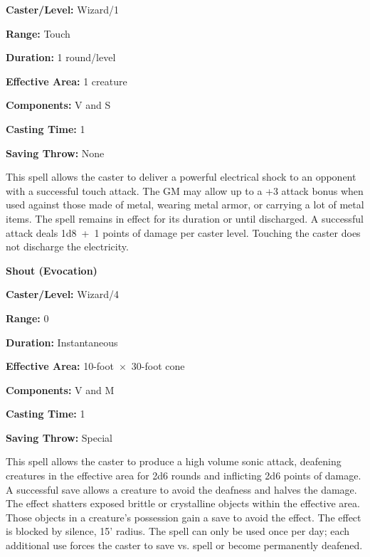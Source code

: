 \begin{multicols}{2}
\begin{minipage}{\columnwidth}
\noindent \textbf{Caster/Level:} Wizard/1

\noindent \textbf{Range:} Touch

\noindent \textbf{Duration:} 1 round/level

\noindent \textbf{Effective Area:} 1 creature

\noindent \textbf{Components:} V and S

\noindent \textbf{Casting Time:} 1

\noindent \textbf{Saving Throw:} None

\end{minipage}

This spell allows the caster to deliver a powerful electrical shock to an opponent with a successful touch attack.  The GM may allow up to a +3 attack bonus when used against those made of metal, wearing metal armor, or carrying a lot of metal items.  The spell remains in effect for its duration or until discharged.  A successful attack deals 1d8~+~1 points of damage per caster level.  Touching the caster does not discharge the electricity.

\vspace{1em}

\noindent
\begin{minipage}{\columnwidth}

\noindent \textbf{Shout (Evocation)}

\noindent \textbf{Caster/Level:} Wizard/4

\noindent \textbf{Range:} 0

\noindent \textbf{Duration:} Instantaneous

\noindent \textbf{Effective Area:} 10-foot~$\times$~30-foot cone

\noindent \textbf{Components:} V and M

\noindent \textbf{Casting Time:} 1

\noindent \textbf{Saving Throw:} Special

\end{minipage}

This spell allows the caster to produce a high volume sonic attack, deafening creatures in the effective area for 2d6 rounds and inflicting 2d6 points of damage.  A successful save allows a creature to avoid the deafness and halves the damage.  The effect shatters exposed brittle or crystalline objects within the effective area.  Those objects in a creature's possession gain a save to avoid the effect.  The effect is blocked by silence, 15' radius.  The spell can only be used once per day; each additional use forces the caster to save vs. spell or become permanently deafened.


\end{multicols}
